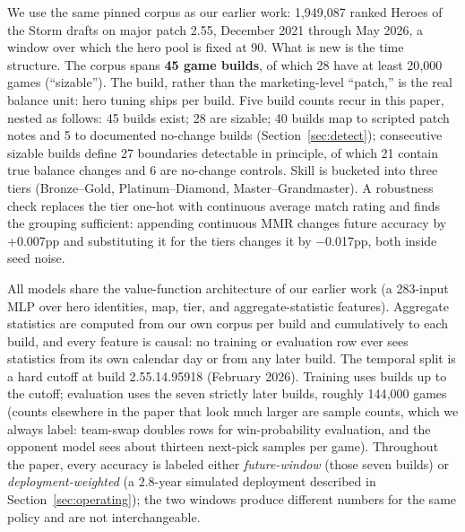 \documentclass[journal]{IEEEtran}
\begin{document}
We use the same pinned corpus as our earlier work: 1{,}949{,}087 ranked
Heroes of the Storm drafts on major patch 2.55, December 2021 through May
2026, a window over which the hero pool is fixed at 90. What is new is
the time structure. The corpus spans \textbf{45 game builds}, of which 28
have at least 20{,}000 games (``sizable''). The build, rather than the
marketing-level ``patch,'' is the real balance unit: hero tuning ships
per build. Five build counts recur in this paper, nested as follows: 45
builds exist; 28 are sizable; 40 builds map to scripted patch notes and
5 to documented no-change builds (Section~\ref{sec:detect}); consecutive
sizable builds define 27 boundaries detectable in principle, of which 21
contain true balance changes and 6 are no-change controls. Skill
is bucketed into three tiers (Bronze--Gold, Platinum--Diamond,
Master--Grandmaster). A robustness check replaces the tier one-hot with
continuous average match rating and finds the grouping sufficient:
appending continuous MMR changes future accuracy by +0.007pp and
substituting it for the tiers changes it by $-$0.017pp, both inside seed
noise.

All models share the value-function architecture of our earlier work (a
283-input MLP over hero identities, map, tier, and aggregate-statistic
features). Aggregate statistics are computed from our own corpus per
build and cumulatively to each build, and every feature is causal: no
training or evaluation row ever sees statistics from its own calendar day
or from any later build. The temporal split is a hard cutoff at build
2.55.14.95918 (February 2026). Training uses builds up to the cutoff;
evaluation uses the seven strictly later builds, roughly 144{,}000 games
(counts elsewhere in the paper that look much larger are sample counts,
which we always label: team-swap doubles rows for win-probability
evaluation, and the opponent model sees about thirteen next-pick samples
per game).
Throughout the paper, every accuracy is labeled either
\emph{future-window} (those seven builds) or \emph{deployment-weighted}
(a 2.8-year simulated deployment described in
Section~\ref{sec:operating}); the two windows produce different numbers
for the same policy and are not interchangeable.
\end{document}
